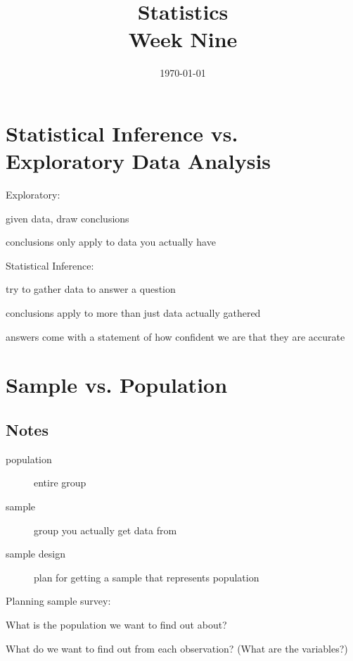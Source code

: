 \documentclass[landscape]{exam}
\title{Statistics \\ Week Nine}
\date{\today}
\author{}
\begin{document}
  \maketitle
  \tableofcontents

  \section{Statistical Inference vs. Exploratory Data Analysis}
  
  Exploratory:
  \begin{itemize*}
    \item given data, draw conclusions
    \item conclusions only apply to data you actually have
  \end{itemize*}

  Statistical Inference:
  \begin{itemize*}
    \item try to gather data to answer a question
    \item conclusions apply to more than just data actually gathered
    \item answers come with a statement of how confident we are that they are
      accurate
  \end{itemize*}

  \section{Sample vs. Population}

  \subsection{Notes}
  \begin{description}
    \item[population] entire group
    \item[sample] group you actually get data from
    \item[sample design] plan for getting a sample that represents population
  \end{description}

  Planning sample survey:
  \begin{itemize*}
    \item What is the population we want to find out about? 
    \item What do we want to find out from each observation? (What are the variables?)
  \end{itemize*}
\end{document}
